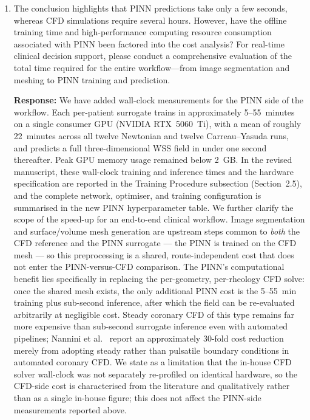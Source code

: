 \documentclass[11pt]{article}
\begin{document}
\begin{enumerate}[]
The limitation regarding the rigid-wall assumption, including its impact on wall shear stress (WSS) estimation and the reported magnitude of associated errors in stenotic vessels based on previous literature, has now been added and discussed in the revised version of the manuscript.

    \item The conclusion highlights that PINN predictions take only a few seconds, whereas CFD simulations require several hours. However, have the offline training time and high-performance computing resource consumption associated with PINN been factored into the cost analysis? For real-time clinical decision support, please conduct a comprehensive evaluation of the total time required for the entire workflow—from image segmentation and meshing to PINN training and prediction.

    \textbf{Response:} We have added wall-clock measurements for the PINN side of the workflow. Each per-patient surrogate trains in approximately 5--55~minutes on a single consumer GPU (NVIDIA RTX~5060~Ti), with a mean of roughly 22~minutes across all twelve Newtonian and twelve Carreau--Yasuda runs, and predicts a full three-dimensional WSS field in under one second thereafter. Peak GPU memory usage remained below 2~GB. In the revised manuscript, these wall-clock training and inference times and the hardware specification are reported in the Training Procedure subsection (Section~2.5), and the complete network, optimiser, and training configuration is summarised in the new PINN hyperparameter table. We further clarify the scope of the speed-up for an end-to-end clinical workflow. Image segmentation and surface/volume mesh generation are upstream steps common to \emph{both} the CFD reference and the PINN surrogate --- the PINN is trained on the CFD mesh --- so this preprocessing is a shared, route-independent cost that does not enter the PINN-versus-CFD comparison. The PINN's computational benefit lies specifically in replacing the per-geometry, per-rheology CFD solve: once the shared mesh exists, the only additional PINN cost is the 5--55~min training plus sub-second inference, after which the field can be re-evaluated arbitrarily at negligible cost. Steady coronary CFD of this type remains far more expensive than sub-second surrogate inference even with automated pipelines; Nannini et al.~\cite{Nannini2024} report an approximately 30-fold cost reduction merely from adopting steady rather than pulsatile boundary conditions in automated coronary CFD. We state as a limitation that the in-house CFD solver wall-clock was not separately re-profiled on identical hardware, so the CFD-side cost is characterised from the literature and qualitatively rather than as a single in-house figure; this does not affect the PINN-side measurements reported above.
\end{enumerate}
\end{document}
